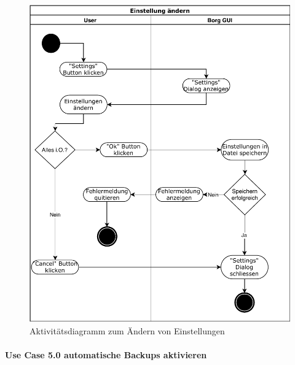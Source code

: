 \begin{figure}[htbp]
\centering
\includegraphics[width=.9\linewidth]{pictures/activity_settings.pdf}
\caption{\label{fig:orgec8a55e}
Aktivitätsdiagramm zum Ändern von Einstellungen}
\end{figure}

\newpage
\paragraph{Use Case 5.0 automatische Backups aktivieren}
\label{sec:orgf4aa53a}

